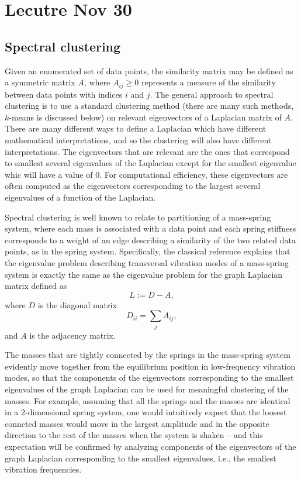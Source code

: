 \section{Lecutre Nov 30}

\subsection{Spectral clustering}

Given an enumerated set of data points, the similarity matrix may be defined as a symmetric matrix \(A\), where \(A_{ij} \ge 0\) represents a measure of the similarity between data points with indices \(i\) and \(j\).
The general approach to spectral clustering is to use a standard clustering method (there are many such methods, \(k\)-means is discussed below) on relevant eigenvectors of a Laplacian matrix of \(A\).
There are many different ways to define a Laplacian which have different mathematical interpretations, and so the clustering will also have different interpretations.
The eigenvectors that are relevant are the ones that correspond to smallest several eigenvalues of the Laplacian except for the smallest eigenvalue whic will have a value of \(0\).
For computational efficiency, these eigenvectors are often computed as the eigenvectors corresponding to the largest several eigenvalues of a function of the Laplacian.

Spectral clustering is well known to relate to partitioning of a mass-spring system, where each mass is associated with a data point and each spring stiffness corresponds to a weight of an edge describing a similarity of the two related data points, as in the spring system.
Specifically, the classical reference explains that the eigenvalue problem describing transversal vibration modes of a mass-spring system is exactly the same as the eigenvalue problem for the graph Laplacian matrix defined as
\[
	L := D - A,
\]
where \(D\) is the diagonal matrix
\[
	D_{ii} = \sum_{j}A_{ij},
\]
and \(A\) is the adjacency matrix.

The masses that are tightly connected by the springs in the mass-spring system evidently move together from the equilibrium position in low-frequency vibration modes, so that the components of the eigenvectors corresponding to the smallest eigenvalues of the graph Laplacian can be used for meaningful clustering of the masses.
For example, assuming that all the springs and the masses are identical in a \(2\)-dimensional spring system, one would intuitively expect that the loosest conncted masses would move in the largest amplitude  and in the opposite direction to the rest of the masses when the system is shaken -- and this expectation will be confirmed by analyzing components of the eigenvectors of the graph Laplacian corresponding to the smallest eigenvalues, i.e., the smallest vibration frequencies. 

